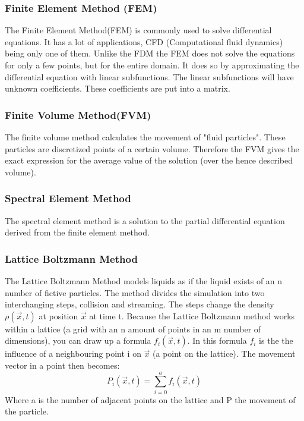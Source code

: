 \documentclass{article}
\begin{document}
\subsubsection{Finite Element Method (FEM)}
The Finite Element Method(FEM) is commonly used to solve differential equations. It has a lot of applications, CFD (Computational fluid dynamics) being only one of them. Unlike the FDM the FEM does not solve the equations for only a few points, but for the entire domain. It does so by approximating the differential equation with linear subfunctions. The linear subfunctions will have unknown coefficients. These coefficients are put into a matrix.
\subsubsection{Finite Volume Method(FVM)}
The finite volume method calculates the movement of "fluid particles". These particles are discretized points of a certain volume.\cite{Finite Volume} Therefore the FVM gives the exact expression for the average value of the solution (over the hence described volume). %
\subsubsection{Spectral Element Method}
The spectral element method is a solution to the partial differential equation derived from the finite element method.
\subsubsection{Lattice Boltzmann Method}
The Lattice Boltzmann Method models liquids as if the liquid exists of an n number of fictive particles. The method divides the simulation into two interchanging steps, collision and streaming. The steps change the density $\rho{(\vec{x},t)}$ at position $\vec{x}$ at time t. Because the Lattice Boltzmann method works within a lattice (a grid with an n amount of points in an m number of dimensions), you can draw up a formula $f_{i}(\vec{x},t)$. In this formula $f_{i}$ is the the influence of a neighbouring point i on $\vec{x}$ (a point on the lattice). The movement vector in a point then becomes: \[P_{i}(\vec{x},t) = \sum_{i=0}^{a}f_{i}(\vec{x},t)\] Where a is the number of adjacent points on the lattice and P the movement of the particle.
\end{document}
